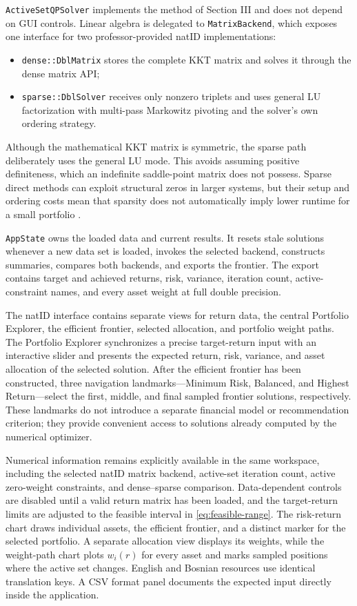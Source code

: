 \documentclass[conference]{IEEEtran}
\begin{document}
\texttt{ActiveSetQPSolver} implements the method of Section III and does not
depend on GUI controls. Linear algebra is delegated to
\texttt{MatrixBackend}, which exposes one interface for two professor-provided
natID implementations:
\begin{itemize}
    \item \texttt{dense::DblMatrix} stores the complete KKT matrix and solves
    it through the dense matrix API;
    \item \texttt{sparse::DblSolver} receives only nonzero triplets and uses
    general LU factorization with multi-pass Markowitz pivoting and the
    solver's own ordering strategy.
\end{itemize}
Although the mathematical KKT matrix is symmetric, the sparse path deliberately
uses the general LU mode. This avoids assuming positive definiteness, which an
indefinite saddle-point matrix does not possess. Sparse direct methods can
exploit structural zeros in larger systems, but their setup and ordering costs
mean that sparsity does not automatically imply lower runtime for a small
portfolio \cite{davis2006}.

\texttt{AppState} owns the loaded data and current results. It resets stale
solutions whenever a new data set is loaded, invokes the selected backend,
constructs summaries, compares both backends, and exports the frontier. The
export contains target and achieved returns, risk, variance, iteration count,
active-constraint names, and every asset weight at full double precision.

The natID interface contains separate views for return data, the central
Portfolio Explorer, the efficient frontier, selected allocation, and portfolio
weight paths. The Portfolio Explorer synchronizes a precise target-return input
with an interactive slider and presents the expected return, risk, variance,
and asset allocation of the selected solution. After the efficient frontier
has been constructed, three navigation landmarks---Minimum Risk, Balanced, and
Highest Return---select the first, middle, and final sampled frontier solutions,
respectively. These landmarks do not introduce a separate financial model or
recommendation criterion; they provide convenient access to solutions already
computed by the numerical optimizer.

Numerical information remains explicitly available in the same workspace,
including the selected natID matrix backend, active-set iteration count, active
zero-weight constraints, and dense--sparse comparison. Data-dependent controls
are disabled until a valid return matrix has been loaded, and the target-return
limits are adjusted to the feasible interval in
\eqref{eq:feasible-range}. The risk-return chart draws individual assets, the
efficient frontier, and a distinct marker for the selected portfolio. A
separate allocation view displays its weights, while the weight-path chart
plots $w_i(r)$ for every asset and marks sampled positions where the active set
changes. English and Bosnian resources use identical translation keys. A CSV
format panel documents the expected input directly inside the application.
\end{document}
